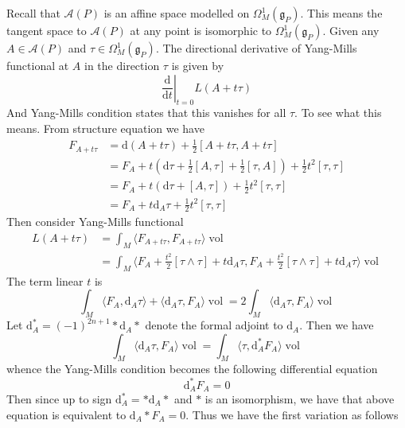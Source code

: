 \documentclass[11pt]{amsart}
\numberwithin{equation}{section}
\theoremstyle{plain}
\theoremstyle{plain}
\numberwithin{equation}{section}
\begin{document}
Recall that $\mathscr{A}(P)$ is an affine space modelled on $\Omega^1_M(\mathfrak{g}_P)$. This means the tangent space to $\mathscr{A}(P)$ at any point is isomorphic to $\Omega^1_M(\mathfrak{g}_P)$. Given any $A\in\mathscr{A}(P)$ and $\tau\in\Omega_M^1(\mathfrak{g}_P)$. The directional derivative of Yang-Mills functional at $A$ in the direction $\tau$ is given by
$$
\left.\frac{\mathrm{d}}{\mathrm{d}t}\right|_{t=0}L(A+t\tau)
$$
And Yang-Mills condition states that this vanishes for all $\tau$. To see what this means. From structure equation we have
$$
\begin{aligned}
F_{A+t\tau} &=\mathrm{d}(A+t \tau)+\frac{1}{2}[A+t \tau, A+t \tau] \\
&=F_{A}+t(\mathrm{d} \tau+\frac{1}{2}[A, \tau]+\frac{1}{2}[\tau, A])+\frac{1}{2} t^{2}[\tau, \tau] \\
&=F_{A}+t(\mathrm{d} \tau+[A, \tau])+\frac{1}{2} t^{2}[\tau, \tau] \\
&=F_{A}+t \mathrm{d}_{A} \tau+\frac{1}{2} t^{2}[\tau, \tau]
\end{aligned}
$$
Then consider Yang-Mills functional
$$
\begin{aligned}
L(A+t\tau)&=\int_M\langle F_{A+t\tau}, F_{A+t\tau}\rangle\operatorname{vol}\\
&=\int_M\langle F_A+\frac{t^2}{2}[\tau\wedge\tau]+t\mathrm{d}_A\tau,F_A+\frac{t^2}{2}[\tau\wedge\tau]+t\mathrm{d}_A\tau\rangle\operatorname{vol}
\end{aligned}
$$
The term linear $t$ is 
$$
\int_M\langle F_A,\mathrm{d}_A\tau\rangle+\langle\mathrm{d}_A\tau,F_A\rangle\operatorname{vol}=2\int_M\langle\mathrm{d}_A\tau,F_A\rangle\operatorname{vol}
$$
Let $\mathrm{d}^*_A=(-1)^{2n+1}*\mathrm{d}_A*$ denote the formal adjoint to $\mathrm{d}_A$. Then we have
$$
\int_M\langle\mathrm{d}_A\tau,F_A\rangle\operatorname{vol}=\int_M\langle\tau,\mathrm{d}_A^*F_A\rangle\operatorname{vol}
$$
whence the Yang-Mills condition becomes the following differential equation
$$
\mathrm{d}_A^*F_A=0
$$
Then since up to sign $\mathrm{d}^*_A=*\mathrm{d}_A*$ and $*$ is an isomorphism, we have that above equation is equivalent to $\mathrm{d}_A*F_A=0$. Thus we have the first variation as follows
\end{document}
